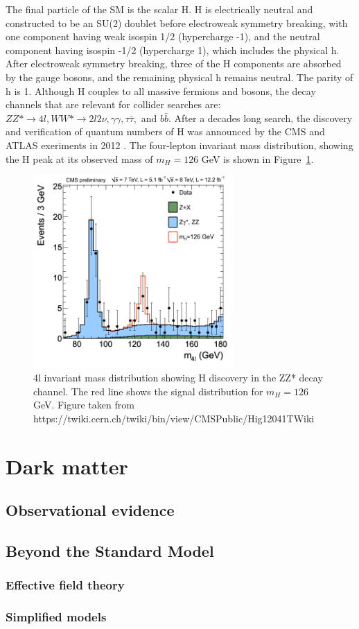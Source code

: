 \indent The final particle of the SM is the scalar H. H is electrically neutral and constructed to be an SU(2) doublet before electroweak symmetry breaking, with one component having weak isospin 1/2 (hypercharge -1), and the neutral component having isospin -1/2 (hypercharge 1), which includes the physical h. After electroweak symmetry breaking, three of the H components are absorbed by the gauge bosons, and the remaining physical h remains neutral. The parity of h is 1. Although H couples to all massive fermions and bosons, the decay channels that are relevant for collider searches are: $ZZ* \rightarrow 4l, WW* \rightarrow 2l2\nu, \gamma\gamma, \tau\bar{\tau},$ and $b\bar{b}$. After a decades long search, the discovery and verification of quantum numbers of H was announced by the CMS and ATLAS exeriments in 2012 \cite{}. The four-lepton invariant mass distribution, showing the H peak at its observed mass of $m_H = 126$ GeV is shown in Figure~\ref{4l}.

\begin{figure}[tbh]
\centering
\includegraphics[width=3in]{figures/ZZMass_7Plus8TeV_70-180_3GeV.png}
\caption{4l invariant mass distribution showing H discovery in the ZZ* decay channel. The red line shows the signal distribution for $m_H=126$ GeV. Figure taken from https://twiki.cern.ch/twiki/bin/view/CMSPublic/Hig12041TWiki}
\label{4l}
\end{figure}


\section{Dark matter}


\subsection{Observational evidence}

\subsection{Beyond the Standard Model}

\subsubsection{Effective field theory}

\subsubsection{Simplified models}
